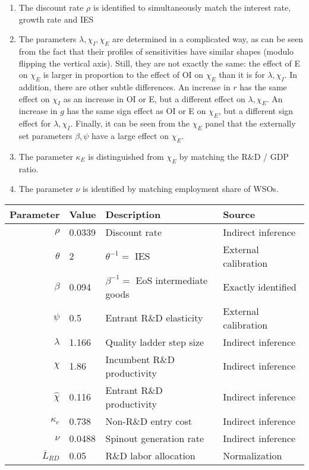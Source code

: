 \documentclass[11pt,english]{article}
\begin{document}
\begin{enumerate}
	\item The discount rate $\rho$ is identified to simultaneously match the interest rate, growth rate and IES
	\item The parameters $\lambda, \chi_I, \chi_E$ are determined in a complicated way, as can be seen from the fact that their profiles of sensitivities have similar shapes (modulo flipping the vertical axis). Still, they are not exactly the same: the effect of E on $\chi_E$ is larger in proportion to the effect of OI on $\chi_E$ than it is for $\lambda, \chi_I$. In addition, there are other subtle differences. An increase in $r$ has the same effect on $\chi_I$ as an increase in OI or E, but a different effect on $\lambda, \chi_E$. An increase in $g$ has the same sign effect as OI or E on $\chi_E$, but a different sign effect for $\lambda, \chi_I$. Finally, it can be seen from the $\chi_E$ panel that the externally set parameters $\beta, \psi$ have a large effect on $\chi_E$.
	\item The parameter $\kappa_E$ is distinguished from $\chi_E$ by matching the R\&D / GDP ratio.
	\item The parameter $\nu$ is identified by matching employment share of WSOs. 
\end{enumerate}

\begin{table}[]
	\centering
	\label{calibration_parameters}
	\begin{tabular}{rlll}
		\toprule \toprule
		Parameter & Value & Description & Source \tabularnewline
		\midrule
		$\rho$ & 0.0339 & Discount rate  & Indirect inference \tabularnewline
		$\theta$ & 2 & $\theta^{-1} = $ IES & External calibration 
		\tabularnewline
		$\beta$ & 0.094 & $\beta^{-1} = $ EoS intermediate goods & Exactly identified \tabularnewline 
		$\psi$ & 0.5 & Entrant R\&D elasticity & External calibration \tabularnewline
		$\lambda$ & 1.166 & Quality ladder step size & Indirect inference 
		\tabularnewline
		$\chi$ & 1.86 & Incumbent R\&D productivity & Indirect inference 
		\tabularnewline
		$\hat{\chi}$ & 0.116 & Entrant R\&D productivity & Indirect inference \tabularnewline 
		$\kappa_e$ & 0.738 & Non-R\&D entry cost & Indirect inference \tabularnewline
		$\nu$ & 0.0488 & Spinout generation rate  & Indirect inference\tabularnewline
		$\bar{L}_{RD}$ & 0.05 & R\&D labor allocation  & Normalization \tabularnewline
		\bottomrule
	\end{tabular}
\end{table}
\end{document}
